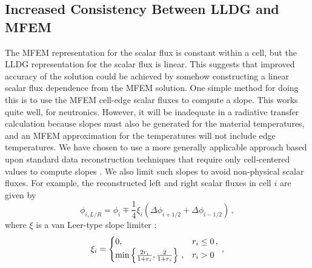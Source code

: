 


\subsection{Increased Consistency Between LLDG and MFEM}

The MFEM representation for the scalar flux is constant within a cell, but the LLDG representation for the scalar flux is linear.  This suggests that improved 
accuracy of the \SN solution could be achieved by somehow constructing a linear scalar flux dependence from the MFEM solution.  One simple method for doing 
this is to use the MFEM cell-edge scalar fluxes to compute a slope.  This works quite well, for neutronics.  However, it will be inadequate in a radiative 
transfer calculation because slopes must also be generated for the material temperatures, and an MFEM approximation for the temperatures will not include 
edge temperatures.  We have chosen to use a more generally applicable approach based upon standard data reconstruction techniques 
that require only cell-centered values to compute slopes \cite{vanLeer}.  We also limit such slopes to avoid non-physical scalar fluxes.  For example, the reconstructed left and right scalar fluxes in cell $i$ are given by 
	\begin{equation} \label{consistent:reconstruction}
		\phi_{i,L/R} = \phi_i \mp \frac{1}{4} \xi_i \left(\Delta \phi_{i+1/2} + \Delta \phi_{i-1/2}\right) \,,
	\end{equation}
where $\xi$ is a van Leer-type slope limiter \cite{vanLeer}:
	\begin{equation} 
		\xi_i = \begin{cases}
			0, & r_i \leq 0 \,, \\
			\text{min}\left\{ \frac{2r_i}{1+r_i} , \frac{2}{1+r_i} \right\} \,, & r_i > 0
		\end{cases} \,,
	\end{equation}

